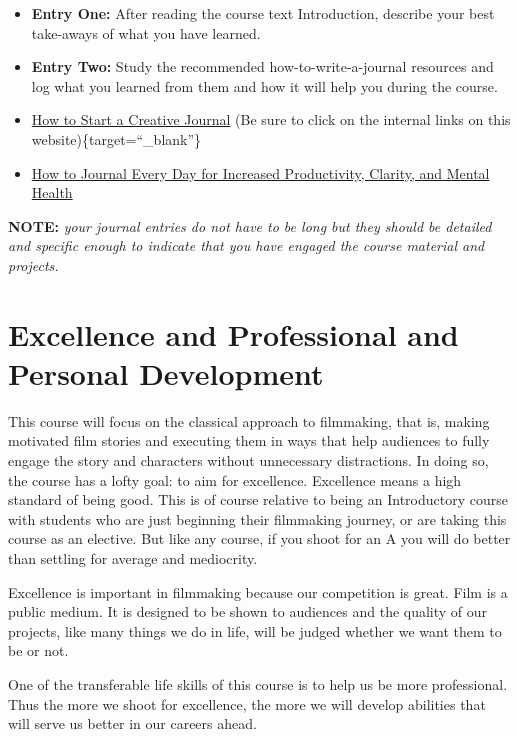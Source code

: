 \documentclass[
]{book}
\providecommand{\tightlist}{%
  \setlength{\itemsep}{0pt}\setlength{\parskip}{0pt}}
\begin{document}
\begin{reflect}
\begin{itemize}
\tightlist
\item
  \textbf{Entry One:} After reading the course text Introduction, describe your best take-aways of what you have learned.
\item
  \textbf{Entry Two:} Study the recommended how-to-write-a-journal resources and log what you learned from them and how it will help you during the course.
\item
  \href{https://karenbanes.com/how-to-start-a-creative-journal}{How to Start a Creative Journal} (Be sure to click on the internal links on this website)\{target=``\_blank''\}
\item
  \href{https://www.youtube.com/watch?v=hUTWo7_W0lc}{How to Journal Every Day for Increased Productivity, Clarity, and Mental Health}
\end{itemize}

\textbf{NOTE:} \emph{your journal entries do not have to be long but they should be detailed and specific enough to indicate that you have engaged the course material and projects.}
\end{reflect}

\hypertarget{excellence-and-professional-and-personal-development}{%
\section{Excellence and Professional and Personal Development}\label{excellence-and-professional-and-personal-development}}

This course will focus on the classical approach to filmmaking, that is, making motivated film stories and executing them in ways that help audiences to fully engage the story and characters without unnecessary distractions. In doing so, the course has a lofty goal: to aim for excellence. Excellence means a high standard of being good. This is of course relative to being an Introductory course with students who are just beginning their filmmaking journey, or are taking this course as an elective. But like any course, if you shoot for an A you will do better than settling for average and mediocrity.

Excellence is important in filmmaking because our competition is great. Film is a public medium. It is designed to be shown to audiences and the quality of our projects, like many things we do in life, will be judged whether we want them to be or not.

One of the transferable life skills of this course is to help us be more professional. Thus the more we shoot for excellence, the more we will develop abilities that will serve us better in our careers ahead.
\end{document}
